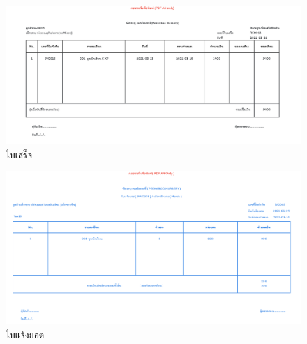 \begin{figure}
    \begin{center}
      \includegraphics[width=\linewidth]{images/slipPage.png}
    \end{center}
    \caption[Poem]{ใบเสร็จ}
    \label{fig:Slip}
\end{figure}

\begin{figure}
    \begin{center}
      \includegraphics[width=\linewidth]{images/invoicePage.png}
    \end{center}
    \caption[Poem]{ใบแจ้งยอด}
    \label{fig:invoice}
\end{figure}

